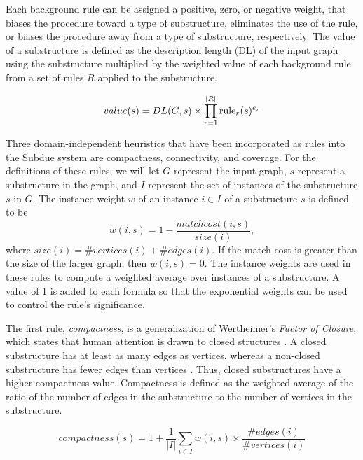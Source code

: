 Each background rule can be assigned a positive, zero, or negative weight,
that biases the procedure toward a type of substructure, eliminates the use
of the rule, or biases the procedure away from a type of substructure,
respectively.  The value of a substructure is defined as
the description length (DL)
of the input graph using the substructure multiplied by
the weighted value of each background rule from a set of rules $R$ applied
to the substructure.

\begin{equation}
value(s) = DL(G,s) \times \prod_{r = 1}^{\left| R \right|} {\rm rule}_r(s)^{e_r}
\end{equation}

Three domain-independent heuristics that have been incorporated as rules
into the {\sc Subdue}
system are compactness, connectivity, and coverage.  For the definitions of
these rules, we will let $G$ represent the input graph, $s$ represent
a substructure in the graph, and $I$ represent the set of instances of the
substructure $s$ in $G$.  The instance weight $w$ of an instance $i \in I$ of
a substructure $s$ is defined to be
\begin{equation}
w(i,s) = 1 - \frac{matchcost(i,s)}{size(i)},
\end{equation}
where $size(i) = \#vertices(i) + \#edges(i)$.  If the match cost is
greater than the size of the larger graph, then $w(i,s) = 0$.
The instance weights are used in these rules to compute a weighted average
over instances of a substructure.
A value of 1 is added to each formula so that the exponential weights
can be used to control the rule's significance.

The first rule,
{\em compactness}, is a generalization of
Wertheimer's {\em Factor of Closure}, which states that human attention is
drawn to closed structures \cite{wertheimer/laws}.  A closed substructure
has at least as many edges as vertices, whereas a non-closed
substructure has fewer edges than vertices \cite{prather/discrete/76}.
Thus, closed substructures have a higher compactness value.  Compactness is
defined as the weighted average of
the ratio of the number of edges in the substructure to the
number of vertices in the substructure.

\begin{equation}
compactness(s) = 1 + \frac{1}{\left| I \right|}
\sum_{i \in I}^{} w(i,s) \times \frac{\#edges(i)}{\#vertices(i)}
\end{equation}


